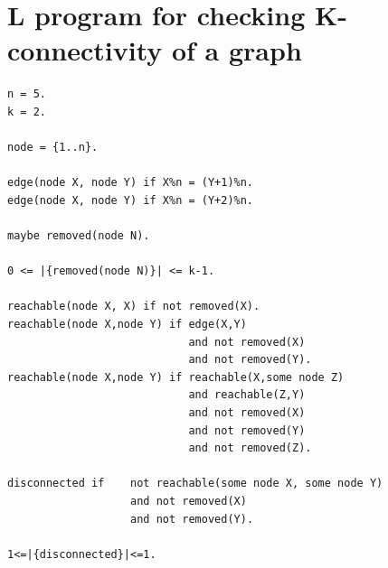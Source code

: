 \documentclass[a4paper,10pt]{article}
\begin{document}
\section{L program for checking K-connectivity of a graph}\label{B}
\begin{verbatim}
n = 5.
k = 2.

node = {1..n}.

edge(node X, node Y) if X%n = (Y+1)%n.
edge(node X, node Y) if X%n = (Y+2)%n.

maybe removed(node N).

0 <= |{removed(node N)}| <= k-1.

reachable(node X, X) if not removed(X).
reachable(node X,node Y) if edge(X,Y) 
                            and not removed(X) 
                            and not removed(Y). 
reachable(node X,node Y) if reachable(X,some node Z)
                            and reachable(Z,Y) 
                            and not removed(X) 
                            and not removed(Y) 
                            and not removed(Z).

disconnected if    not reachable(some node X, some node Y) 
                   and not removed(X)
                   and not removed(Y).                

1<=|{disconnected}|<=1.
\end{verbatim}
%
%
\end{document}
